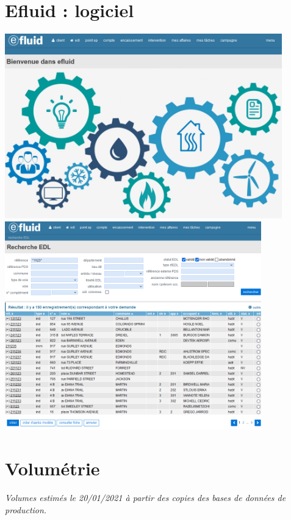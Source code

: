 \documentclass[a4paper, 12pt]{report}
\begin{document}
\chapter{Efluid : logiciel}
\label{appendix:logiciel}

\begin{center}
  \includegraphics[height=8cm]{../res/efluid-1.png}
  \null
  \vspace{0.3cm}
  \includegraphics[height=9cm]{../res/efluid-2.png}
\end{center}

\chapter{Volumétrie}
\label{appendix:volumetrie}

\textit{Volumes estimés le 20/01/2021 à partir des copies des bases de données de production.}\\
\end{document}
